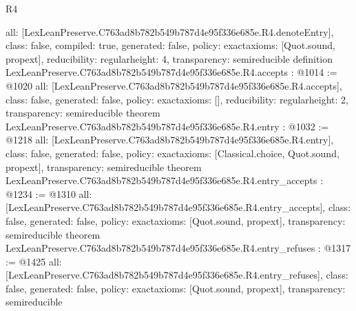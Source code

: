\begin{lexlean}{R4}
\begin{coremodule}
{  all: [LexLeanPreserve.C763ad8b782b549b787d4e95f336e685e.R4.denoteEntry],
  class: false,
  compiled: true,
  generated: false,
  policy: exact{axioms: [Quot.sound, propext]},
  reducibility: regular{height: 4},
  transparency: semireducible
}
definition LexLeanPreserve.C763ad8b782b549b787d4e95f336e685e.R4.accepts : @1014 := @1020 {
  all: [LexLeanPreserve.C763ad8b782b549b787d4e95f336e685e.R4.accepts],
  class: false,
  generated: false,
  policy: exact{axioms: []},
  reducibility: regular{height: 2},
  transparency: semireducible
}
theorem LexLeanPreserve.C763ad8b782b549b787d4e95f336e685e.R4.entry : @1032 := @1218 {
  all: [LexLeanPreserve.C763ad8b782b549b787d4e95f336e685e.R4.entry],
  class: false,
  generated: false,
  policy: exact{axioms: [Classical.choice, Quot.sound, propext]},
  transparency: semireducible
}
theorem LexLeanPreserve.C763ad8b782b549b787d4e95f336e685e.R4.entry_accepts : @1234 := @1310 {
  all: [LexLeanPreserve.C763ad8b782b549b787d4e95f336e685e.R4.entry_accepts],
  class: false,
  generated: false,
  policy: exact{axioms: [Quot.sound, propext]},
  transparency: semireducible
}
theorem LexLeanPreserve.C763ad8b782b549b787d4e95f336e685e.R4.entry_refuses : @1317 := @1425 {
  all: [LexLeanPreserve.C763ad8b782b549b787d4e95f336e685e.R4.entry_refuses],
  class: false,
  generated: false,
  policy: exact{axioms: [Quot.sound, propext]},
  transparency: semireducible
}


\end{coremodule}
\end{lexlean}
